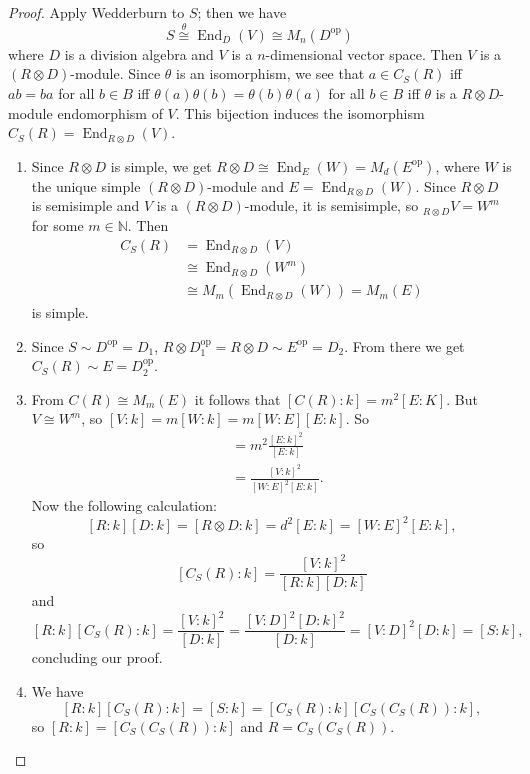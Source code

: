\documentclass[10pt, a4paper]{article}
\newenvironment{noticeC}{%
  \tcolorbox[%
  notitle,
  empty,
  enhanced,  %
  breakable,
  coltext=black, 
  fontupper=\rmfamily,
  noparskip,
  sharp corners,
  boxrule=-1pt,  %
  frame hidden,
  left=7pt,  %
  right=7pt,
  top=5pt,
  bottom=5pt,
  before skip=2.5ex plus 2pt,
  after skip=2.5ex plus 2pt,
  overlay unbroken and last={%
  },
  ]}
{\endtcolorbox}
\newenvironment{myproof}%
  {\begin{noticeC}\begin{proof}}%
  {\end{proof}\end{noticeC}}
\newcommand{\N}{\mathbb {N}}
\DeclareMathOperator{\op}{op}
\DeclareMathOperator{\en}{End}
\begin{document}
\begin{myproof}
  Apply Wedderburn to $S$; then we have 
  $$S \stackrel{\theta}{\cong} \en_D (V) \cong M_n (D^{\op})$$
  where $D$ is a division algebra and $V$ is a $n$-dimensional vector space.
  Then $V$ is a $(R \otimes D)$-module.
  Since $\theta$ is an isomorphism, we see that $a \in C_S (R)$ iff $ab = ba$ for all $b \in B$
  iff $\theta(a) \theta(b) = \theta(b) \theta (a)$ for all $b \in B$ iff $\theta$ is a $R \otimes D$-module endomorphism of $V$.
  This bijection induces the isomorphism $C_S (R) = \en_{R \otimes D} (V)$.
  \begin{enumerate}
    \item Since $R \otimes D$ is simple, we get $R \otimes D \cong \en_E (W) = M_d (E^{\op})$,
    where $W$ is the unique simple $(R \otimes D)$-module and $E = \en_{R \otimes D} (W)$.
    Since $R \otimes D$ is semisimple and $V$ is a $(R \otimes D)$-module, it is semisimple, so $_{R \otimes D} V = W^m$ for some $m \in \N$.
    Then 
    \begin{align*}
      C_S(R) &= \en_{R \otimes D} (V)\\
      &\cong \en_{R \otimes D} (W^m)\\
      &\cong M_m (\en_{R \otimes D} (W)) = M_m (E )
    \end{align*} 
    is simple.
    \item Since $S \sim D^{\op} = D_1$, $R \otimes D_1^{\op} = R \otimes D \sim E^{\op} = D_2$.
    From there we get $C_S(R) \sim E = D_2^{\op}$.
    \item From $C(R) \cong M_m (E)$ it follows that $[C(R): k] = m^2 [E : K]$.
    But $V \cong W^m$, so $[V: k] = m [W : k] = m [W: E] [E: k]$.
    So \begin{align*}
      [C_S(R): k] &= m^2 \frac{[E: k]^2}{[E: k]}\\
      &= \frac{[V: k]^2}{[W: E]^2 [E: k]}.
    \end{align*}
    Now the following calculation:
    $$[R: k] [D: k] = [R \otimes D: k] = d^2 [E:k] = [W: E]^2 [E: k],$$
    so $$[C_S(R): k] = \frac{[V: k]^2}{[R:k] [D: k]}$$
    and 
    $$[R: k] [C_S(R): k] = \frac{[V: k]^2}{[D: k]} = \frac{[V : D]^2 [D : k]^2}{[D : k]} = [V : D]^2 [D : k] = [S : k],$$
    concluding our proof.
    \item We have $$[R : k] [C_S(R) : k] = [S : k] = [C_S(R) : k] [C_S(C_S(R)): k],$$
    so $[R : k] = [C_S(C_S (R)): k]$ and $R = C_S (C_S (R))$. \qedhere
  \end{enumerate} 
\end{myproof}
\end{document}
